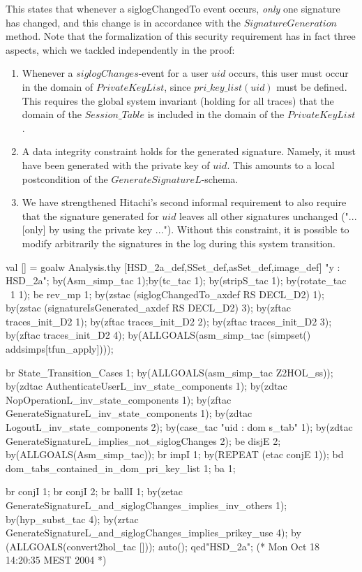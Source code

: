 \documentclass[a4paper,pdftex]{article}
\newenvironment{holz-ml}{\comment}{\endcomment}
\begin{document}
This states that whenever a siglogChangedTo event occurs,
\emph{only} one signature has changed, and this change is 
in accordance with the $SignatureGeneration$ method.
Note that the formalization of this security requirement has in fact
three aspects, which we tackled independently in the proof:
\begin{enumerate}
\item Whenever a $siglogChanges$-event for a user $uid$ occurs, 
      this user must occur in the domain of $PrivateKeyList$,
      since $pri\_key\_list(uid)$ must be defined. This requires the
      global system invariant (holding for all traces) that
      the domain of the $Session\_Table$ is included in the
      domain of the $PrivateKeyList$.
\item A data integrity constraint holds for the generated signature.
      Namely, it must have been generated with the private key of $uid$.  This
      amounts to a local postcondition of the
      $GenerateSignatureL$-schema.
\item We have strengthened Hitachi's second informal requirement to also
      require that the signature generated for $uid$ leaves all other
      signatures unchanged ("... [only] by using the private key
      ..."). Without this constraint, it is possible to modify arbitrarily
      the signatures in the log during this system transition.
\end{enumerate}
\begin{holz-ml}


val [] = goalw Analysis.thy [HSD_2a_def,SSet_def,asSet_def,image_def] "y : HSD_2a";
by(Asm_simp_tac 1);by(tc_tac 1);
by(stripS_tac 1);
by(rotate_tac ~1 1);
be rev_mp 1;
by(zstac (siglogChangedTo_axdef RS DECL_D2) 1);
by(zstac (signatureIsGenerated_axdef RS DECL_D2) 3);
by(zftac traces_init_D2 1);
by(zftac traces_init_D2 2);
by(zftac traces_init_D2 3);
by(zftac traces_init_D2 4);
by(ALLGOALS(asm_simp_tac (simpset() addsimps[tfun_apply])));

br State_Transition_Cases 1;
by(ALLGOALS(asm_simp_tac Z2HOL_ss));
by(zdtac AuthenticateUserL_inv_state_components 1);
by(zdtac NopOperationL_inv_state_components 1);
by(zftac GenerateSignatureL_inv_state_components 1);
by(zdtac LogoutL_inv_state_components 2);
by(case_tac "uid : dom s_tab" 1);
by(zdtac GenerateSignatureL_implies_not_siglogChanges 2);
be disjE 2;
by(ALLGOALS(Asm_simp_tac));
br impI 1;
by(REPEAT (etac conjE 1));
bd dom_tabs_contained_in_dom_pri_key_list 1; ba 1;

br conjI 1; br conjI 2;
br ballI 1; 
by(zetac GenerateSignatureL_and_siglogChanges_implies_inv_others 1);
by(hyp_subst_tac 4);
by(zrtac GenerateSignatureL_and_siglogChanges_implies_prikey_use 4);
by (ALLGOALS(convert2hol_tac []));
auto();
qed"HSD_2a";
(* Mon Oct 18 14:20:35 MEST 2004 *)

\end{holz-ml}
\end{document}
